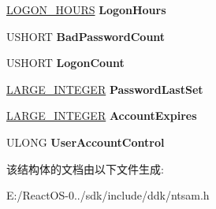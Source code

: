 \begin{DoxyCompactItemize}
\hyperlink{struct___l_o_g_o_n___h_o_u_r_s}{L\+O\+G\+O\+N\+\_\+\+H\+O\+U\+RS} {\bfseries Logon\+Hours}
\item 
\mbox{\label{struct___u_s_e_r___a_c_c_o_u_n_t___i_n_f_o_r_m_a_t_i_o_n_a5abfb0f8570871bc77f2d6f2d1f4a463}} 
U\+S\+H\+O\+RT {\bfseries Bad\+Password\+Count}
\item 
\mbox{\label{struct___u_s_e_r___a_c_c_o_u_n_t___i_n_f_o_r_m_a_t_i_o_n_ac90ddb6fb0a39b1bf1b386ba29a83fc9}} 
U\+S\+H\+O\+RT {\bfseries Logon\+Count}
\item 
\mbox{\label{struct___u_s_e_r___a_c_c_o_u_n_t___i_n_f_o_r_m_a_t_i_o_n_ad42b0660673bfc8739c7de021ac378be}} 
\hyperlink{union___l_a_r_g_e___i_n_t_e_g_e_r}{L\+A\+R\+G\+E\+\_\+\+I\+N\+T\+E\+G\+ER} {\bfseries Password\+Last\+Set}
\item 
\mbox{\label{struct___u_s_e_r___a_c_c_o_u_n_t___i_n_f_o_r_m_a_t_i_o_n_aad7deab336c9110b8d8558db336dbe40}} 
\hyperlink{union___l_a_r_g_e___i_n_t_e_g_e_r}{L\+A\+R\+G\+E\+\_\+\+I\+N\+T\+E\+G\+ER} {\bfseries Account\+Expires}
\item 
\mbox{\label{struct___u_s_e_r___a_c_c_o_u_n_t___i_n_f_o_r_m_a_t_i_o_n_a6ec7b91e97fae15755bb336c649685ea}} 
U\+L\+O\+NG {\bfseries User\+Account\+Control}
\end{DoxyCompactItemize}


该结构体的文档由以下文件生成\+:\begin{DoxyCompactItemize}
\item 
E\+:/\+React\+O\+S-\/0../sdk/include/ddk/ntsam.\+h\end{DoxyCompactItemize}
